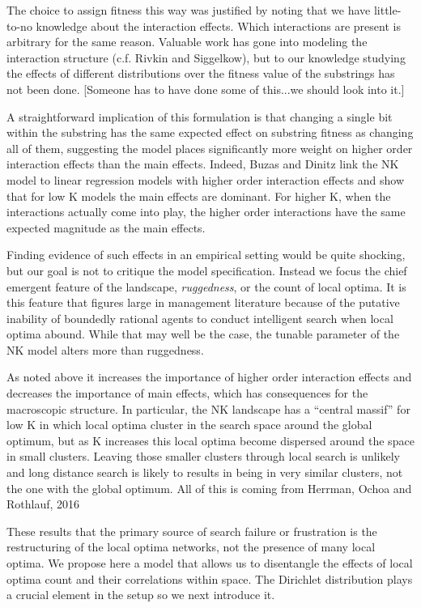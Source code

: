 \documentclass[12pt]{article}
\begin{document}
The choice to assign fitness this way was justified by noting that we have little-to-no knowledge about the interaction effects. Which interactions are present is arbitrary for the same reason. Valuable work has gone into modeling the interaction structure (c.f. Rivkin and Siggelkow), but to our knowledge studying the effects of different distributions over the fitness value of the substrings has not been done. [Someone has to have done some of this...we should look into it.]

A straightforward implication of this formulation is that changing a single bit within the substring has the same expected effect on substring fitness as changing all of them, suggesting the model places significantly more weight on higher order interaction effects than the main effects. Indeed, Buzas and Dinitz link the NK model to linear regression models with higher order interaction effects and show that for low K models the main effects are dominant. For higher K, when the interactions actually come into play, the higher order interactions have the same expected magnitude as the main effects.

Finding evidence of such effects in an empirical setting would be quite shocking, but our goal is not to critique the model specification. Instead we focus the chief emergent feature of the landscape, \textit{ruggedness}, or the count of local optima. It is this feature that figures large in management literature because of the putative inability of boundedly rational agents to conduct intelligent search when local optima abound. While that may well be the case, the tunable parameter of the NK model alters more than ruggedness.

As noted above it increases the importance of higher order interaction effects and decreases the importance of main effects, which has consequences for the macroscopic structure. In particular, the NK landscape has a ``central massif'' for low K in which local optima cluster in the search space around the global optimum, but as K increases this local optima become dispersed around the space in small clusters. Leaving those smaller clusters through local search is unlikely and long distance search is likely to results in being in very similar clusters, not the one with the global optimum. {All of this is coming from Herrman, Ochoa and Rothlauf, 2016}

These results that the primary source of search failure or frustration is the restructuring of the local optima networks, not the presence of many local optima. We propose here a model that allows us to disentangle the effects of local optima count and their correlations within space. The Dirichlet distribution plays a crucial element in the setup so we next introduce it.
\end{document}

